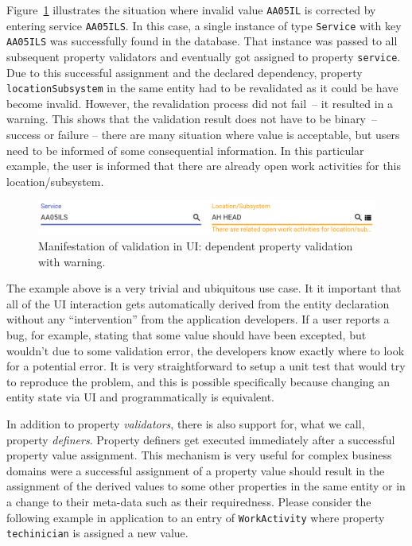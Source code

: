 \documentclass[a4paper,12pt,oneside,openright,final]{memoir} %
\begin{document}
	Figure~\ref{fig:dependent-validation} illustrates the situation where invalid value \texttt{AA05IL} is corrected by entering service \texttt{AA05ILS}.
	In this case, a single instance of type \texttt{Service} with key \texttt{AA05ILS} was successfully found in the database.
	That instance was passed to all subsequent property validators and eventually got assigned to property \texttt{service}.
	Due to this successful assignment and the declared dependency, property \texttt{locationSubsystem} in the same entity had to be revalidated as it could be have become invalid.
	However, the revalidation process did not fail~-- it resulted in a warning.
	This shows that the validation result does not have to be binary~-- success or failure -- there are many situation where value is acceptable, but users need to be informed of some consequential information.
	In this particular example, the user is informed that there are already open work activities for this location/subsystem.	
	
	\begin{figure}[!h]
  		\centering
      	\includegraphics[width=1.0\textwidth]{images/03-wa-dependent-props.png}  
   	  	\caption{Manifestation of validation in UI: dependent property validation with warning.}
   		\label{fig:dependent-validation}
  	\end{figure}

	The example above is a very trivial and ubiquitous use case.
	It it important that all of the UI interaction gets automatically derived from the entity declaration without any ``intervention'' from the application developers.
	If a user reports a bug, for example, stating that some value should have been excepted, but wouldn't due to some validation error, the developers know exactly where to look for a potential error.
	It is very straightforward to setup a unit test that would try to reproduce the problem, and this is possible specifically because changing an entity state via UI and programmatically is equivalent.
	
	\vspace{8pt}
	In addition to property \emph{validators}, there is also support for, what we call, property \emph{definers}.
	Property definers get executed immediately after a successful property value assignment.
	This mechanism is very useful for complex business domains were a successful assignment of a property value should result in the assignment of the derived values to some other properties in the same entity or in a change to their meta-data such as their requiredness.
	Please consider the following example in application to an entry of \texttt{WorkActivity} where property \texttt{techinician} is assigned a new value.
	
\end{document}
